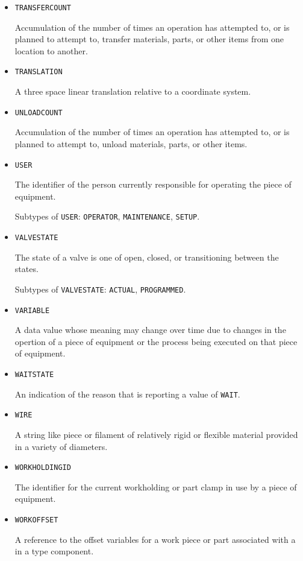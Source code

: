 \begin{itemize}
Subtypes of \texttt{TOOL\textunderscore OFFSET}: \texttt{RADIAL}, \texttt{LENGTH}.

\item \texttt{TRANSFER\textunderscore COUNT}  

Accumulation of the number of times an operation has attempted to, or is planned to attempt to, transfer materials, parts, or other items from one location to another.


\item \texttt{TRANSLATION}  

A three space linear translation relative to a coordinate system.


\item \texttt{UNLOAD\textunderscore COUNT}  

Accumulation of the number of times an operation has attempted to, or is planned to attempt to, unload materials, parts, or other items.


\item \texttt{USER}  

The identifier of the person currently responsible for operating the piece of equipment.

Subtypes of \texttt{USER}: \texttt{OPERATOR}, \texttt{MAINTENANCE}, \texttt{SET\textunderscore UP}.

\item \texttt{VALVE\textunderscore STATE}  

The state of a valve is one of open, closed, or transitioning between the states.

Subtypes of \texttt{VALVE\textunderscore STATE}: \texttt{ACTUAL}, \texttt{PROGRAMMED}.

\item \texttt{VARIABLE}  

A data value whose meaning may change over time due to changes in the opertion of a piece of equipment or the process being executed on that piece of equipment.


\item \texttt{WAIT\textunderscore STATE}  

An indication of the reason that  is reporting a value of \texttt{WAIT}.


\item \texttt{WIRE}  

A string like piece or filament of relatively rigid or flexible material provided in a variety of diameters.


\item \texttt{WORKHOLDING\textunderscore ID}  

The identifier for the current workholding or part clamp in use by a piece of equipment.


\item \texttt{WORK\textunderscore OFFSET}  

A reference to the offset variables for a work piece or part associated with a  in a  type component.

\end{itemize}



